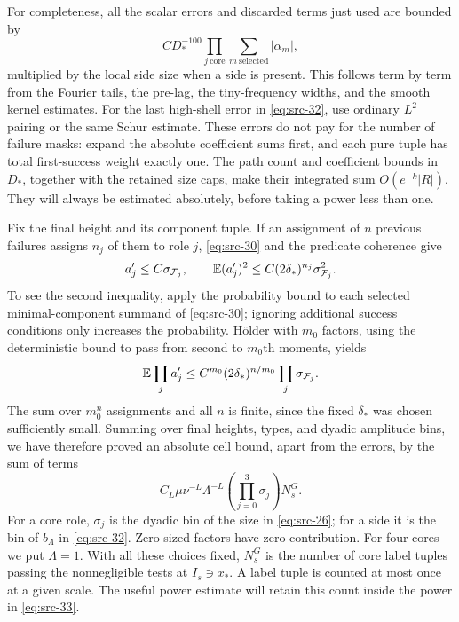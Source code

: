 For completeness, all the scalar errors and discarded terms just used
are bounded by
\[
 C D_*^{-100}\prod_{j\ \mathrm{core}}
       \sum_{m\ \mathrm{selected}}|\alpha_m|,
\]
multiplied by the local side size when a side is present.  This follows
term by term from the Fourier tails, the pre-lag, the tiny-frequency
widths, and the smooth kernel estimates.  For the last high-shell
error in \eqref{eq:src-32}, use ordinary $L^2$ pairing or the same
Schur estimate.  These errors do not pay for the number of failure
masks: expand the absolute coefficient sums first, and each pure
tuple has total first-success weight exactly one.  The path count
and coefficient bounds in $D_*$, together with the retained size
caps, make their integrated sum $O(e^{-k}|R|)$.  They will always be
estimated absolutely, before taking a power less than one.

Fix the final height and its component tuple.  If an assignment of
$n$ previous failures assigns $n_j$ of them to role $j$,
\eqref{eq:src-30} and the predicate coherence give
\[
 a'_j\leq C\sigma_{\mathcal F_j},\qquad
 \mathbb E(a'_j)^2\leq C(2\delta_*)^{n_j}
                       \sigma_{\mathcal F_j}^2.
\]
To see the second inequality, apply the probability bound to each
selected minimal-component summand of \eqref{eq:src-30}; ignoring
additional success conditions only increases the probability.
H\"older with $m_0$ factors, using the deterministic bound to pass
from second to $m_0$th moments, yields
\[
 \mathbb E\prod_j a'_j
 \leq C^{m_0}(2\delta_*)^{n/m_0}
                        \prod_j\sigma_{\mathcal F_j}.
\]
The sum over $m_0^n$ assignments and all $n$ is finite, since the
fixed $\delta_*$ was chosen sufficiently small.  Summing over final
heights, types, and dyadic amplitude bins, we have therefore proved
an absolute cell bound, apart from the errors, by the sum of terms
\begin{equation*}
 C_L\mu\nu^{-L}\Lambda^{-L}
       \left(\prod_{j=0}^3\sigma_j\right)N_s^G.
 \tag{33}\label{eq:src-33}
\end{equation*}
For a core role, $\sigma_j$ is the dyadic bin of the size in
\eqref{eq:src-26}; for a side it is the bin of $b_\Lambda$ in
\eqref{eq:src-32}.  Zero-sized factors have zero contribution.  For
four cores we put $\Lambda=1$.  With all these choices fixed,
$N_s^G$ is the number of core label tuples passing the nonnegligible
tests at $I_s\ni x_*$.  A label tuple is counted at most once at a
given scale.  The useful power estimate will retain this count inside
the power in \eqref{eq:src-33}.

